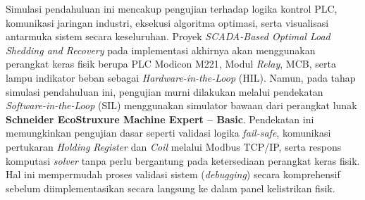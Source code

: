 
Simulasi pendahuluan ini mencakup pengujian terhadap logika kontrol PLC, komunikasi jaringan industri, eksekusi algoritma optimasi, serta visualisasi antarmuka sistem secara keseluruhan. Proyek \textit{SCADA-Based Optimal Load Shedding and Recovery} pada implementasi akhirnya akan menggunakan perangkat keras fisik berupa PLC Modicon M221, Modul \textit{Relay}, MCB, serta lampu indikator beban sebagai \textit{Hardware-in-the-Loop} (HIL). 
Namun, pada tahap simulasi pendahuluan ini, pengujian murni dilakukan melalui pendekatan \textit{Software-in-the-Loop} (SIL) menggunakan simulator bawaan dari perangkat lunak \textbf{Schneider EcoStruxure Machine Expert -- Basic}. Pendekatan ini memungkinkan pengujian dasar seperti validasi logika \textit{fail-safe}, komunikasi pertukaran \textit{Holding Register} dan \textit{Coil} melalui Modbus TCP/IP, serta respons komputasi \textit{solver} tanpa perlu bergantung pada ketersediaan perangkat keras fisik. Hal ini mempermudah proses validasi sistem (\textit{debugging}) secara komprehensif sebelum diimplementasikan secara langsung ke dalam panel kelistrikan fisik.

